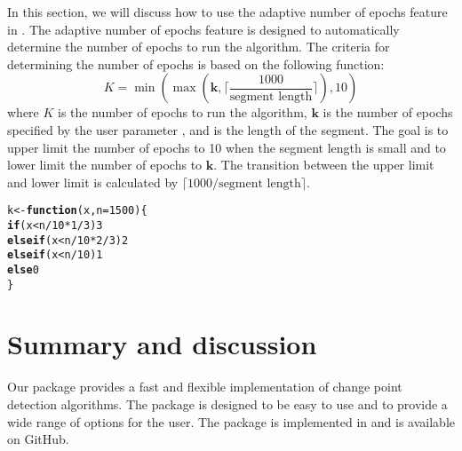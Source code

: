 \documentclass[article]{jss}\usepackage[]{graphicx}\usepackage[]{xcolor}
\makeatletter
\newcommand{\hlnum}[1]{\textcolor[rgb]{0.686,0.059,0.569}{#1}}%
\newcommand{\hlopt}[1]{\textcolor[rgb]{0,0,0}{#1}}%
\newcommand{\hlstd}[1]{\textcolor[rgb]{0.345,0.345,0.345}{#1}}%
\newcommand{\hlkwa}[1]{\textcolor[rgb]{0.161,0.373,0.58}{\textbf{#1}}}%
\newcommand{\hlkwb}[1]{\textcolor[rgb]{0.69,0.353,0.396}{#1}}%
\newcommand{\hlkwc}[1]{\textcolor[rgb]{0.333,0.667,0.333}{#1}}%
\newenvironment{kframe}{%
 \def\at@end@of@kframe{}%
 \ifinner\ifhmode%
  \def\at@end@of@kframe{\end{minipage}}%
  \begin{minipage}{\columnwidth}%
 \fi\fi%
 \def\FrameCommand##1{\hskip\@totalleftmargin \hskip-\fboxsep
 \colorbox{shadecolor}{##1}\hskip-\fboxsep
     \hskip-\linewidth \hskip-\@totalleftmargin \hskip\columnwidth}%
 \MakeFramed {\advance\hsize-\width
   \@totalleftmargin\z@ \linewidth\hsize
   \@setminipage}}%
 {\par\unskip\endMakeFramed%
 \at@end@of@kframe}
\newenvironment{knitrout}{}{} %
\makeatother
\begin{document}
In this section, we will discuss how to use the adaptive number of epochs
feature in . The adaptive number of epochs feature is designed to
automatically determine the number of epochs to run the algorithm. The criteria
for determining the number of epochs is based on the following function:
%
\begin{equation} \label{eq:adaptive number of epochs}
  K = \min(\max(\boldsymbol{k}, \lceil \frac{1000}{\text{segment length}} \rceil), 10)
\end{equation}
%
where $K$ is the number of epochs to run the algorithm, $\boldsymbol{k}$ is the
number of epochs specified by the user parameter , and  is the
length of the segment. The goal is to upper limit the number of epochs to 10
when the segment length is small and to lower limit the number of epochs to
$\boldsymbol{k}$. The transition between the upper limit and lower limit is
calculated by $\lceil 1000 / \text{segment length} \rceil$.

\begin{knitrout}
\color{fgcolor}\begin{kframe}
\begin{alltt}
\hlstd{k} \hlkwb{<-} \hlkwa{function}\hlstd{(}\hlkwc{x}\hlstd{,} \hlkwc{n} \hlstd{=} \hlnum{1500}\hlstd{) \{}
  \hlkwa{if} \hlstd{(x} \hlopt{<} \hlstd{n} \hlopt{/} \hlnum{10} \hlopt{*} \hlnum{1} \hlopt{/} \hlnum{3}\hlstd{)} \hlnum{3}
  \hlkwa{else if} \hlstd{(x} \hlopt{<} \hlstd{n} \hlopt{/} \hlnum{10} \hlopt{*} \hlnum{2} \hlopt{/} \hlnum{3}\hlstd{)} \hlnum{2}
  \hlkwa{else if} \hlstd{(x} \hlopt{<} \hlstd{n} \hlopt{/} \hlnum{10}\hlstd{)} \hlnum{1}
  \hlkwa{else} \hlnum{0}
\hlstd{\}}
\end{alltt}
\end{kframe}
\end{knitrout}


\section{Summary and discussion} \label{sec:summary}

Our package  provides a fast and flexible implementation of
change point detection algorithms. The package is designed to be easy to use
and to provide a wide range of options for the user. The package is
implemented in  and is available on GitHub.
\end{document}
